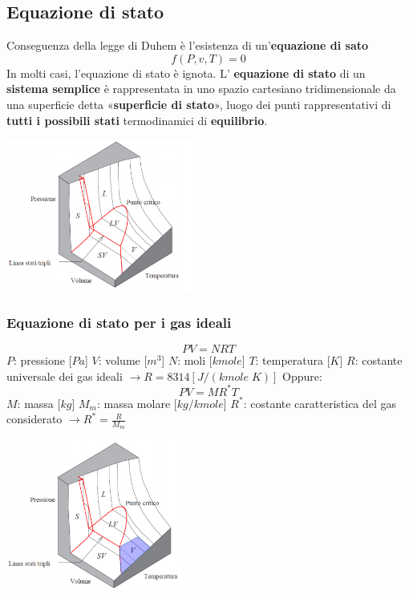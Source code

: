 \subsection{Equazione di stato}
Conseguenza della legge di Duhem è l'esistenza di un'\textbf{equazione di sato}
\[
    f(P,v,T) = 0
\]
In molti casi, l'equazione di stato è ignota.\newline
\newline
L’ \textbf{equazione di stato} di un \textbf{sistema semplice} è rappresentata in uno spazio cartesiano tridimensionale da una superficie detta «\textbf{superficie di stato}», luogo dei punti rappresentativi di \textbf{tutti i possibili stati} termodinamici di \textbf{equilibrio}.
\begin{center}
    \includegraphics[height=5cm]{../L01/img4.PNG}
\end{center}
\subsubsection{Equazione di stato per i gas ideali}
\[
    PV=NRT
\]
$P$: pressione [$Pa$]\newline
$V$: volume [$m^3$]\newline
$N$: moli [$kmole$]\newline
$T$: temperatura [$K$]\newline
$R$: costante universale dei gas ideali $\rightarrow R = 8314 [J/(kmole \; K)]$\newline
Oppure:
\[
    PV = MR^*T
\]
$M$: massa [$kg$]\newline
$M_m$: massa molare [$kg/kmole$]\newline
$R^*$: costante caratteristica del gas considerato $\rightarrow R^* = \frac{R}{M_m}$
\begin{center}
    \includegraphics[height=5cm]{../L01/img5.PNG}
\end{center}
